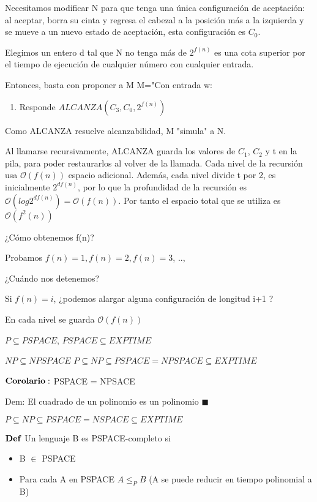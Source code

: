 \documentclass{homework}
\begin{document}
Necesitamos modificar N para que tenga una única configuración de aceptación: al aceptar, borra su cinta y regresa el cabezal a la posición más a la izquierda y se mueve a un nuevo estado de aceptación, esta configuración es $C_0$.

Elegimos un entero d tal que N no tenga más de $2^{f(n)}$ es una cota superior por el tiempo de ejecución de cualquier número con cualquier entrada.

Entonces, basta con proponer a M
M="Con entrada w:
\begin{enumerate}
	\item Responde $ALCANZA(C_3, C_0, 2^{f(n)})$
\end{enumerate}

Como ALCANZA resuelve alcanzabilidad, M "simula" a N.

Al llamarse recursivamente, ALCANZA guarda los valores de $C_1$, $C_2$ y t en la pila, para poder restaurarlos al volver de la llamada. Cada nivel de la recursión usa $\mathcal{O}(f(n))$ espacio adicional. Además, cada nivel divide t por 2, es inicialmente  $2^{d f(n)}$, por lo que la profundidad de la recursión es $\mathcal{O}(log2^{d f(n)}) = \mathcal{O}(f(n))$. Por tanto el espacio total que se utiliza es $\mathcal{O}(f^{2}(n))$

¿Cómo obtenemos f(n)?

Probamos $f(n) = 1, f(n)=2, f(n)=3$, .., 

¿Cuándo nos detenemos?

Si $f(n)=i$, ¿podemos alargar alguna configuración de longitud i+1 ?

En cada nivel se guarda $\mathcal{O}(f(n))$

$P \subseteq PSPACE$, $PSPACE \subseteq EXPTIME$

$NP \subseteq NPSPACE$ $P \subseteq NP \subseteq PSPACE = NPSPACE \subseteq EXPTIME$

$\bf{Corolario:}$ PSPACE = NPSACE

Dem: El cuadrado de un polinomio es un polinomio $\blacksquare$

$P \subseteq NP \subseteq PSPACE = NSPACE \subseteq EXPTIME$

$\bf{Def}$ Un lenguaje B es PSPACE-completo si 
\begin{itemize}
	\item B $\in$ PSPACE
	\item Para cada A en PSPACE $A \leq_P B$ (A se puede reducir en tiempo polinomial a B)
\end{itemize}
\end{document}
